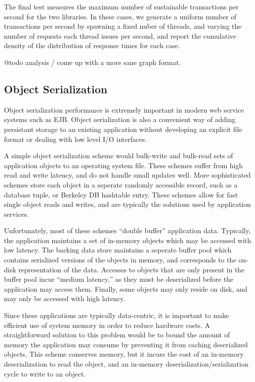 \documentclass[letterpaper,twocolumn,english]{article}
\begin{document}
The final test measures the maximum number of sustainable transactions
per second for the two libraries.  In these cases, we generate a
uniform number of transactions per second by spawning a fixed nuber of
threads, and varying the number of requests each thread issues per
second, and report the cumulative density of the distribution of
response times for each case.

@todo analysis / come up with a more sane graph format.

\subsection{Object Serialization}\label{OASYS}

Object serialization performance is extremely important in modern web
service systems such as EJB.  Object serialization is also a
convenient way of adding persistant storage to an existing application
without developing an explicit file format or dealing with low level
I/O interfaces.

A simple object serialization scheme would bulk-write and bulk-read
sets of application objects to an operating system file.  These
schemes suffer from high read and write latency, and do not handle
small updates well.  More sophisticated schemes store each object in a
seperate randomly accessible record, such as a database tuple, or
Berkeley DB hashtable entry.  These schemes allow for fast single
object reads and writes, and are typically the solutions used by
application services.

Unfortunately, most of these schemes ``double buffer'' application
data.  Typically, the application maintains a set of in-memory objects
which may be accessed with low latency.  The backing data store
maintains a seperate buffer pool which contains serialized versions of
the objects in memory, and corresponds to the on-disk representation
of the data.  Accesses to objects that are only present in the buffer
pool incur ``medium latency,'' as they must be deserialized before the
application may access them.  Finally, some objects may only reside on
disk, and may only be accessed with high latency.

Since these applications are typically data-centric, it is important
to make efficient use of system memory in order to reduce hardware
costs.  A straightforward solution to this problem would be to bound
the amount of memory the application may consume by preventing it from
caching deserialized objects.  This scheme conserves memory, but it
incurs the cost of an in-memory deserialization to read the object,
and an in-memory deserialization/serialization cycle to write to an
object.
\end{document}
